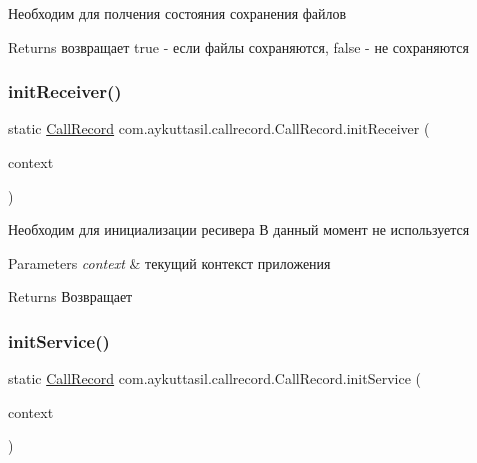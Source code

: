 Необходим для полчения состояния сохранения файлов \begin{DoxyReturn}{Returns}
возвращает true -\/ если файлы сохраняются, false -\/ не сохраняются 
\end{DoxyReturn}
\mbox{\label{classcom_1_1aykuttasil_1_1callrecord_1_1_call_record_acf60d04b55e69ddc6489a2c0e06a2f36}} 
\subsubsection{\texorpdfstring{init\+Receiver()}{initReceiver()}}
{\footnotesize\ttfamily static \hyperlink{classcom_1_1aykuttasil_1_1callrecord_1_1_call_record}{Call\+Record} com.\+aykuttasil.\+callrecord.\+Call\+Record.\+init\+Receiver (\begin{DoxyParamCaption}\item[{Context}]{context }\end{DoxyParamCaption})\hspace{0.3cm}{\ttfamily [static]}}

Необходим для инициализации ресивера В данный момент не используется 
\begin{DoxyParams}{Parameters}
{\em context} & текущий контекст приложения \\
\hline
\end{DoxyParams}
\begin{DoxyReturn}{Returns}
Возвращает 
\end{DoxyReturn}
\mbox{\label{classcom_1_1aykuttasil_1_1callrecord_1_1_call_record_a58717cda16f688a875a0e32f03d3dbbc}} 
\subsubsection{\texorpdfstring{init\+Service()}{initService()}}
{\footnotesize\ttfamily static \hyperlink{classcom_1_1aykuttasil_1_1callrecord_1_1_call_record}{Call\+Record} com.\+aykuttasil.\+callrecord.\+Call\+Record.\+init\+Service (\begin{DoxyParamCaption}\item[{Context}]{context }\end{DoxyParamCaption})\hspace{0.3cm}{\ttfamily [static]}}

